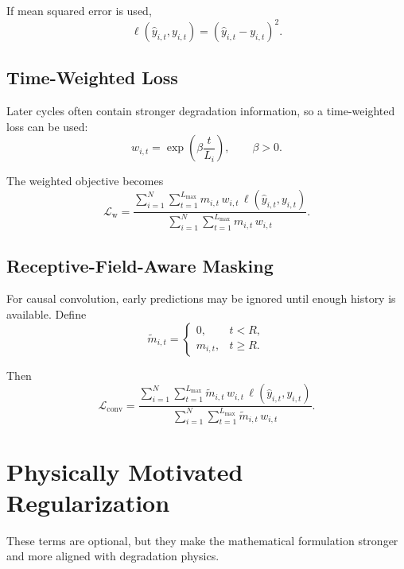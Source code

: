 \documentclass[11pt,a4paper]{article}
\begin{document}
If mean squared error is used,
\begin{equation}
    \ell(\hat{y}_{i,t}, y_{i,t}) = (\hat{y}_{i,t} - y_{i,t})^2.
\end{equation}

\subsection{Time-Weighted Loss}
Later cycles often contain stronger degradation information, so a time-weighted loss can be used:
\begin{equation}
    w_{i,t} = \exp\left(\beta \frac{t}{L_i}\right),
    \qquad \beta > 0.
\end{equation}

The weighted objective becomes
\begin{equation}
    \mathcal{L}_{\mathrm{w}} =
    \frac{
        \sum_{i=1}^{N}\sum_{t=1}^{L_{\max}}
        m_{i,t}\,w_{i,t}\,\ell(\hat{y}_{i,t}, y_{i,t})
    }{
        \sum_{i=1}^{N}\sum_{t=1}^{L_{\max}} m_{i,t}\,w_{i,t}
    }.
\end{equation}

\subsection{Receptive-Field-Aware Masking}
For causal convolution, early predictions may be ignored until enough history is available. Define
\begin{equation}
    \tilde{m}_{i,t} =
    \begin{cases}
        0, & t < R,\\
        m_{i,t}, & t \geq R.
    \end{cases}
\end{equation}

Then
\begin{equation}
    \mathcal{L}_{\mathrm{conv}} =
    \frac{
        \sum_{i=1}^{N}\sum_{t=1}^{L_{\max}}
        \tilde{m}_{i,t}\,w_{i,t}\,\ell(\hat{y}_{i,t}, y_{i,t})
    }{
        \sum_{i=1}^{N}\sum_{t=1}^{L_{\max}} \tilde{m}_{i,t}\,w_{i,t}
    }.
\end{equation}

\section{Physically Motivated Regularization}
These terms are optional, but they make the mathematical formulation stronger and more aligned with degradation physics.
\end{document}
